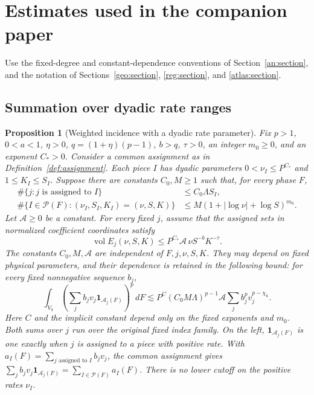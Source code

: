 \documentclass[11pt]{amsart}
\newtheorem{proposition}[theorem]{Proposition}
\theoremstyle{definition}
\theoremstyle{remark}
\numberwithin{equation}{section}
\begin{document}
\section{Estimates used in the companion paper}\label{app:shared-estimates}
Use the fixed-degree and constant-dependence conventions of Section~\ref{an:section}, and the notation of Sections~\ref{geo:section}, \ref{reg:section}, and \ref{atlas:section}.

\subsection{Summation over dyadic rate ranges}\label{an:band-summation}

\begin{proposition}[Weighted incidence with a dyadic rate parameter]\label{low:6:r3:weighted-holder}
Fix $p>1$, $0<a<1$, $\eta>0$, $q=(1+\eta)(p-1)$, $b>q$, $\tau>0$, an integer $m_0\ge0$, and an exponent $C_*>0$. Consider a common assignment as in Definition~\ref{def:assignment}. Each piece $I$ has dyadic parameters $0<\nu_I\le P^{C_*}$ and $1\le K_I\le S_I$. Suppose there are constants $C_0,M\ge1$ such that, for every phase $F$,
\[
\begin{aligned}
\#\{j:j\text{ is assigned to }I\}&\le C_0\Lambda S_I,\\
\#\{I\in\mathscr P(F):(\nu_I,S_I,K_I)=(\nu,S,K)\}&\le M(1+|\log\nu|+\log S)^{m_0}.
\end{aligned}
\]
Let $\mathcal A\ge0$ be a constant. For every fixed $j$, assume that the assigned sets in normalized coefficient coordinates satisfy
\[
\operatorname{vol}E_j(\nu,S,K)\le P^{C_*}\mathcal A\,\nu S^{-b}K^{-\tau}.
\]
The constants $C_0,M,\mathcal A$ are independent of $F,j,\nu,S,K$. They may depend on fixed physical parameters, and their dependence is retained in the following bound: for every fixed nonnegative sequence $b_j$,
\[
\int_{V_k}\left(\sum_j b_jv_j\mathbf1_{\mathcal A_j(F)}\right)^p\,dF
\lesssim P^C(C_0M\Lambda)^{p-1}\mathcal A\sum_j b_j^pv_j^{p-\chi_k}.
\]
Here $C$ and the implicit constant depend only on the fixed exponents and $m_0$. Both sums over $j$ run over the original fixed index family. On the left, $\mathbf1_{\mathcal A_j(F)}$ is one exactly when $j$ is assigned to a piece with positive rate. With $a_I(F)=\sum_{j\text{ assigned to }I}b_jv_j$, the common assignment gives $\sum_j b_jv_j\mathbf1_{\mathcal A_j(F)}=\sum_{I\in\mathscr P(F)}a_I(F)$. There is no lower cutoff on the positive rates $\nu_I$.
\end{proposition}
\end{document}
